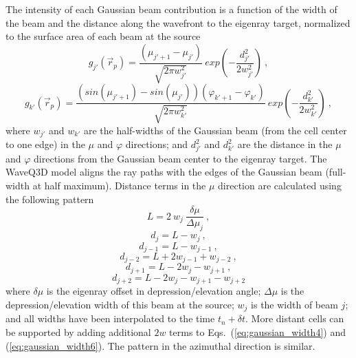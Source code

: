 \documentclass{ws-jca}
\begin{document}
The intensity of each Gaussian beam contribution is a function of the width
of the beam and the distance along the wavefront to the eigenray target,
normalized to the surface area of each beam at the source
\begin{equation}
	g_{j'}(\vec{r}_p) = \frac{ \left( \mu_{j'+1} - \mu_{j'} \right) }
		{\sqrt{2\pi w^2_{j'}}} 
		\: exp \left( - \frac{d^2_{j'}}{2w^2_{j'}} \right) \:,
	\label{eq:gaussian_each1}
\end{equation}
\begin{equation}
	g_{k'}(\vec{r}_p) = \frac{ \left( sin(\mu_{j'+1}) - sin(\mu_{j'}) \right) 
		\left( \varphi_{k'+1} - \varphi_{k'} \right) }
		{\sqrt{2\pi w^2_{k'}}} 
		\: exp \left( - \frac{d^2_{k'}}{2w^2_{k'}} \right) \:,
	\label{eq:gaussian_each2}
\end{equation}
where
\(w_{j'}\) and \(w_{k'}\) are the half-widths of the Gaussian beam (from the cell
center to one edge) in the \(\mu\) and \(\varphi\) directions; and
\(d^2_{j'}\) and \(d^2_{k'}\) are the distance in the \(\mu\) and \(\varphi\)
directions from the Gaussian beam center to the eigenray target. The WaveQ3D model aligns the ray paths with the edges of the Gaussian beam (full-width at half maximum).  Distance terms in the \(\mu\) direction are calculated using the following pattern
\begin{equation}
	L = 2 \: w_j \: \frac{\delta \mu}{\Delta \mu_j} \:,
	\label{eq:gaussian_width1}
\end{equation}
\begin{equation}
	d_j = L - w_j \:,
	\label{eq:gaussian_width2}
\end{equation}
\begin{equation}
	d_{j-1} = L - w_{j-1} \:,
	\label{eq:gaussian_width3}
\end{equation}
\begin{equation}
	d_{j-2} = L + 2 w_{j-1} + w_{j-2} \:,
	\label{eq:gaussian_width4}
\end{equation}
\begin{equation}
	d_{j+1} = L - 2 w_j - w_{j+1} \:,
	\label{eq:gaussian_width5}
\end{equation}
\begin{equation}
	d_{j+2} = L - 2 w_j - w_{j+1} - w_{j+2}
	\label{eq:gaussian_width6}
\end{equation}
where
\(\delta \mu\) is the eigenray offset in depression/elevation angle;
\(\Delta \mu\) is the depression/elevation width of this beam at the source;
\(w_j\) is the width of beam $j$;
and all widths have been interpolated to the time \(t_n+\delta t\).
More distant cells can be supported by adding additional $2w$ terms to
Eqs.~(\ref{eq:gaussian_width4}) and (\ref{eq:gaussian_width6}). The pattern
in the azimuthal direction is similar.
\end{document}
